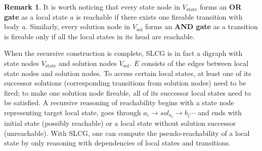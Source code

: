 \documentclass{article}
\theoremstyle{definition}
\newtheorem{remark}{Remark}
\newcommand{\st}{{\mathrm{state}}}
\newcommand{\sol}{{\mathrm{sol}}}
\begin{document}
\begin{remark}
It is worth noticing that every state node in $V_\st$ forms an \textbf{OR gate} as a local state $a$ is reachable if there exists one fireable transition with body $a$.
Similarly, every solution node in $V_\sol$ forms an \textbf{AND gate} as a transition is fireable only if all the local states in its head are reachable.
\end{remark}



When the recursive construction is complete, SLCG is in fact a digraph with state nodes $V_\st$ and solution nodes $V_\sol$. 
$E$ consists of the edges between local state nodes and solution nodes. 
To access certain local states, at least one of its successor solutions (corresponding transitions from solution nodes) need to be fired; to make one solution node fireable, all of its successor local states need to be satisfied. 
A recursive reasoning of reachability begins with a state node representing target local state, goes through $a_i\to sol_{a_i}\to b_j \cdots$ and ends with initial state (possibly reachable) or a local state without solution successor (unreachable). 
With SLCG, one can compute the pseudo-reachability of a local state by only reasoning with dependencies of local states and transitions.
\end{document}
